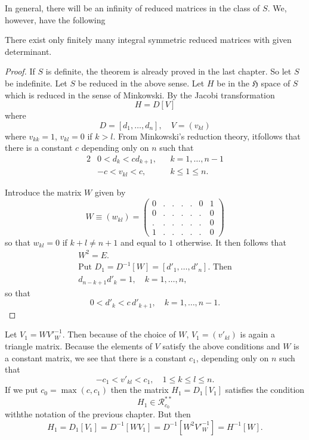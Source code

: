 In general, there will be an infinity of reduced matrices in the class
of $S$. We, however, have the following 

\begin{thm}\label{chap3:thm3}
There exist only finitely many integral symmetric reduced matrices
with given determinant.
\end{thm}

\begin{proof}
If $S$ is definite, the theorem is already proved in the last
chapter. So let $S$ be indefinite. Let $S$ be reduced in the above
sense. Let $H$ be in the $\mathfrak{H}$ space of $S$ which is reduced
in the sense of Minkowski. By the Jacobi transformation
$$
H=D[V]
$$
where
$$
D=[d_{1},\ldots,d_{n}],\quad V=(v_{kl})
$$
where $v_{kk}=1$, $v_{kl}=0$ if $k>l$. From Minkowski's reduction
theory, it\pageoriginale follows that there is a constant $c$
depending only on $n$ such that
\begin{alignat*}{2}
& 0<d_{k}<cd_{k+1}, && k=1,\ldots,n-1\\
& -c<v_{kl}<c,     && k\leq 1\leq n.
\end{alignat*}

Introduce the matrix $W$ given by
\begin{equation*}
W\equiv (w_{kl})=
\begin{pmatrix}
0 & . & . & . & . & 0 & 1\\
0 & . & . & . & . & . & 0\\
. & . & . & . & . & . & 0\\
1 & . & . & . & . & . & 0
\end{pmatrix}\tag{31}\label{c3:eq31}
\end{equation*}
so that $w_{kl}=0$ if $k+l\neq n+1$ and equal to $1$ otherwise. It
then follows that
\begin{gather*}
W^{2}=E.\\
\text{Put } D_{1}=D^{-1}[W]=[d'_{1},\ldots,d'_{n}].\text{ Then}\\
d_{n-k+1}d'_{k}=1,\quad k=1,\ldots,n,
\end{gather*}
so that
\begin{equation*}
0<d'_{k}<c \, d'_{k+1},\quad k=1,\ldots,n-1.\tag{32}\label{c3:eq32}
\end{equation*}
\end{proof}

Let $V_{1}=W{V'}^{-1}_{W}$. Then because of the choice of $W$,
$V_{1}=(v'_{kl})$ is again a triangle matrix. Because the elements of
$V$ satisfy the above conditions and $W$ is a constant matrix, we see
that there is a constant $c_{1}$, depending only on $n$ such that
\begin{equation*}
-c_{1}<v'_{kl}<c_{1},\quad 1\leq k\leq l\leq n.\tag{33}\label{c3:eq33}
\end{equation*}
If we put $c_{0}=\max (c,c_{1})$ then the matrix $H_{1}=D_{1}[V_{1}]$
satisfies the condition
\begin{equation*}
H_{1}\in \mathscr{R}^{\ast\ast}_{c_{0}}\tag{34}\label{c3:eq34}
\end{equation*}
with\pageoriginale the notation of the previous chapter. But then
$$
H_{1}=D_{1}[V_{1}]=D^{-1}[WV_{1}]=D^{-1}[W^{2}{V'}^{-1}_{W}]=H^{-1}[W].
$$

